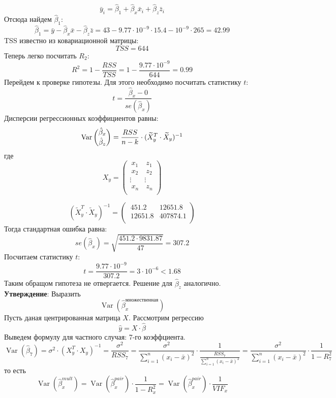 \documentclass[12pt]{article} %
\theoremstyle{definition} %
\DeclareMathOperator{\Var}{Var}
\begin{document}
\[\bar{y}_i=\hat{\beta}_1+\hat{\beta}_x\bar{x}_i+\hat{\beta}_z\bar{z}_i\]
Отсюда найдем $\hat{\beta}_1$:
\[\hat{\beta}_1 = \bar{y} - \hat{\beta}_x\bar{x} - \hat{\beta}_z\bar{z} = 43 - 9.77\cdot10^{-9}\cdot 15.4 - 10^{-9}\cdot 265 = 42.99\]
TSS известно из ковариационной матрицы:
\[TSS = 644\]
Теперь легко посчитать $R_2$:
\[R^2 = 1 - \dfrac{RSS}{TSS} = 1 - \dfrac{9.77\cdot10^{-9}}{644} = 0.99\]
Перейдем к проверке гипотезы. Для этого необходимо посчитать статистику $t$:
\[t = \dfrac{\hat{\beta}_x - 0}{se(\hat{\beta}_x)}\]
Дисперсии регрессионных коэффициентов равны:
\[\Var \dbinom{\hat{\beta}_x}{\hat{\beta}_z} = \dfrac{RSS}{n-k}\cdot{(\widetilde{X}^{T}_y \cdot \widetilde{X}_y)^{-1}}
\]
где \[
 X_y = \begin{pmatrix}
           \ x_{1} &\ z_{1}\\
           \ x_{2} &\ z_{2}\\
           \vdots & \vdots\\
           \ x_{n} &\ z_{n}\\
         \end{pmatrix}
         \]

\[(\widetilde{X}^{T}_y \cdot \widetilde{X}_y)^{-1} = \begin{pmatrix}
            \ 451.2 & 12651.8\\
            \ 12651.8 & 407874.1\\
        \end{pmatrix}
\]
Тогда стандартная ошибка равна:
\[se(\hat{\beta}_x) = \sqrt{\dfrac{451.2\cdot9831.87}{47}} = 307.2\]
Посчитаем статистику $t$:
\[t = \dfrac{9.77\cdot10^{-9}}{307.2} = 3\cdot10^{-6} < 1.68\]
Таким обращом гипотеза не отвергается. Решение для $\hat{\beta}_z$ аналогично.\\

\textbf{Утверждение}: Выразить \[\Var(\hat{\beta}_x^{множественная})\]
Пусть даная центрированная матрица $X$. Рассмотрим регрессию
\[\hat{y} = X\cdot{\hat\beta}\]
Выведем формулу для частного случая: 7-го коэффциента.
\[ \Var(\hat{\beta}_7) = \sigma^2\cdot(X^{T}_y \cdot X_y)^{-1} = \dfrac{\sigma^2}{RSS_7} = \dfrac{\sigma^2}{\sum\limits_{i=1}^n(x_i - \bar{x})^2}\cdot\dfrac{1}{\frac{RSS_7}{\sum\limits_{i=1}^n(x_i - \bar{x})^2}} = \dfrac{\sigma^2}{\sum\limits_{i=1}^n(x_i - \bar{x})^2}\cdot\dfrac{1}{1-R^2_7}\]
то есть
\[\Var(\hat{\beta}_x^{mult}) =  \Var(\hat{\beta}_x^{pair})\cdot\dfrac{1}{1 - R_x^2} = \Var(\hat{\beta}_x^{pair})\cdot\dfrac{1}{VIF_x}\]
\end{document}
